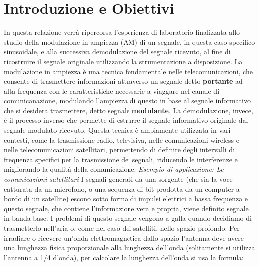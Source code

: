 \section{Introduzione e Obiettivi}
\label{sec:Introduzione}
\thispagestyle{plain}
In questa relazione verrà ripercorsa l'esperienza di laboratorio finalizzata allo studio della modulazione in ampiezza (AM) di un segnale, in questa caso specifico sinusoidale, e alla successiva demodulazione del segnale ricevuto, al fine di ricostruire il segnale originale utilizzando la strumentazione a disposizione. 
\newline
\newline
La modulazione in ampiezza è una tecnica fondamentale nelle telecomunicazioni, che consente di trasmettere informazioni attraverso un segnale detto \textbf{portante} ad alta frequenza con le caratteristiche necessarie a viaggare nel canale di comunicanazione, modulando l'ampiezza di questo in base al segnale informativo che si desidera trasmettere, detto segnale \textbf{modulante}. 
\newline
\newline
La demodulazione, invece, è il processo inverso che permette di estrarre il segnale informativo originale dal segnale modulato ricevuto.
\newline
\newline
Questa tecnica è ampiamente utilizzata in vari contesti, come la trasmissione radio, televisiva, nelle comunicazioni wireless e nelle telecomunicazioni satellitari, permettendo di definire degli intervalli di frequenza specifici per la trasmissione dei segnali, riducendo le interferenze e migliorando la qualità della comunicazione.
\newline
\vspace{0.3cm}
\noindent\textit{Esempio di applicazione: Le comunicazioni satellitari}
\newline
I segnali generati da una sorgente (che sia la voce catturata da un microfono, o una sequenza di bit prodotta da un computer a bordo di un satellite) escono sotto forma di impulsi elettrici a bassa frequenza e questo segnale, che contiene l'informazione vera e propria, viene definito segnale in banda base. I problemi di questo segnale vengono a galla quando decidiamo di trasmetterlo nell'aria o, come nel caso dei satelliti, nello spazio profondo. Per irradiare o ricevere un'onda elettromagnetica dallo spazio l'antenna deve avere una lunghezza fisica proporzionale alla lunghezza dell'onda (solitamente si utilizza l'antenna a 1/4 d'onda), per calcolare la lunghezza dell'onda si usa la formula:
